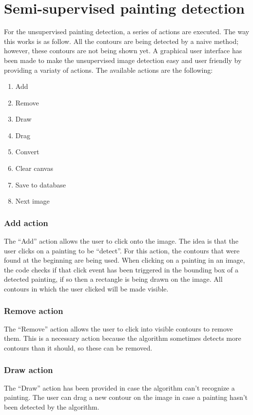 \section{Semi-supervised painting detection}
\label{sec:assignment1}

For the unsupervised painting detection, a series of actions are executed. The way this works is as follow. All the contours are being detected by a naive method; however, these contours are not being shown yet. A graphical user interface has been made to make the unsupervised image detection easy and user friendly by providing a variaty of actions. The available actions are the following:
\begin{enumerate}
    \item Add
    \item Remove
    \item Draw
    \item Drag
    \item Convert
    \item Clear canvas
    \item Save to database
    \item Next image
\end{enumerate}

\subsubsection{Add action}
The ``Add'' action allows the user to click onto the image. The idea is that the user clicks on a painting to be ``detect''. For this action, the contours that were found at the beginning are being used. When clicking on a painting in an image, the code checks if that click event has been triggered in the bounding box of a detected painting, if so then a rectangle is being drawn on the image. All contours in which the user clicked will be made visible.

\subsubsection{Remove action}
The ``Remove'' action allows the user to click into visible contours to remove them. This is a necessary action because the algorithm sometimes detects more contours than it should, so these can be removed.

\subsubsection{Draw action}
The ``Draw'' action has been provided in case the algorithm can't recognize a painting. The user can drag a new contour on the image in case a painting hasn't been detected by the algorithm.

